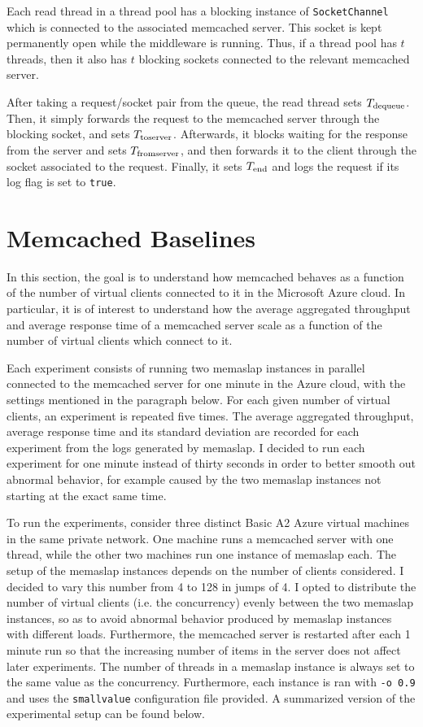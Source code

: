 \documentclass[11pt]{article}
\begin{document}
Each read thread in a thread pool has a blocking instance of \texttt{SocketChannel} which is connected to the associated memcached server. This socket is kept permanently open while the middleware is running. Thus, if a thread pool has $t$ threads, then it also has $t$ blocking sockets connected to the relevant memcached server.

After taking a request/socket pair from the queue, the read thread sets $T_{\textnormal{dequeue}}$. Then, it simply forwards the request to the memcached server through the blocking socket, and sets $T_{\textnormal{toserver}}$. Afterwards, it blocks waiting for the response from the server and sets $T_{\textnormal{fromserver}}$, and then forwards it to the client through the socket associated to the request. Finally, it sets $T_{\textnormal{end}}$ and logs the request if its log flag is set to \texttt{true}.

\section{Memcached Baselines}\label{sec:baseline}

In this section, the goal is to understand how memcached behaves as a function of the number of virtual clients connected to it in the Microsoft Azure cloud. In particular, it is of interest to understand how the average aggregated throughput and average response time of a memcached server scale as a function of the number of virtual clients which connect to it.

Each experiment consists of running two memaslap instances in parallel connected to the memcached server for one minute in the Azure cloud, with the settings mentioned in the paragraph below. For each given number of virtual clients, an experiment is repeated five times. The average aggregated throughput, average response time and its standard deviation are recorded for each experiment from the logs generated by memaslap. I decided to run each experiment for one minute instead of thirty seconds in order to better smooth out abnormal behavior, for example caused by the two memaslap instances not starting at the exact same time.

To run the experiments, consider three distinct Basic A2 Azure virtual machines in the same private network. One machine runs a memcached server with one thread, while the other two machines run one instance of memaslap each. The setup of the memaslap instances depends on the number of clients considered. I decided to vary this number from 4 to 128 in jumps of 4. I opted to distribute the number of virtual clients (i.e. the concurrency) evenly between the two memaslap instances, so as to avoid abnormal behavior produced by memaslap instances with different loads. Furthermore, the memcached server is restarted after each 1 minute run so that the increasing number of items in the server does not affect later experiments. The number of threads in a memaslap instance is always set to the same value as the concurrency. Furthermore, each instance is ran with \texttt{-o 0.9} and uses the \texttt{smallvalue} configuration file provided. A summarized version of the experimental setup can be found below. 
\end{document}
